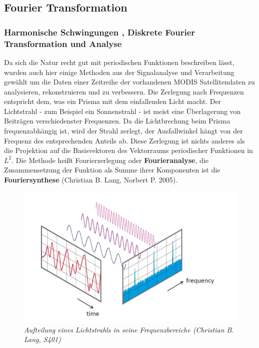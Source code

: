 \documentclass[11pt]{report}
\begin{document}
\subsection{Fourier Transformation}
\subsubsection{Harmonische Schwingungen , Diskrete Fourier Transformation und Analyse}
Da sich die Natur recht gut mit periodischen Funktionen beschreiben lässt, wurden auch hier einige Methoden aus der Signalanalyse und Verarbeitung gewählt um die Daten einer Zeitreihe der vorhandenen MODIS Satellitendaten zu analysieren, rekonstruieren und zu verbessern. Die Zerlegung nach Frequenzen entspricht dem, was ein Prisma mit dem einfallenden Licht macht. Der Lichtstrahl - zum Beispiel ein Sonnenstrahl - ist meist eine Überlagerung von Beiträgen verschiedenster Frequenzen. Da die Lichtbrechung beim Prisma frequenzabhängig ist, wird der Strahl zerlegt, der Ausfallwinkel hängt von der Frequenz des entsprechenden Anteils ab. Diese Zerlegung ist nichts anderes als die Projektion auf die Basisvektoren des Vektorraums periodischer Funktionen in $L^{2}$. Die Methode heißt Fourierzerlegung oder \textbf{Fourieranalyse}, die Zusammensetzung der Funktion als Summe ihrer Komponenten ist die \textbf{Fouriersynthese} (Christian B. Lang, Norbert P. 2005). 


\begin{figure}[H]
\centering
\includegraphics[scale=0.6]{./Grafiken/Fitting/FFT/FFT_time_und_frequenz_anteile.jpg}
\caption{\textit{Aufteilung eines Lichtstrahls in seine Frequenzbereiche (Christian B. Lang, S401)}}
\end{figure}
\end{document}
